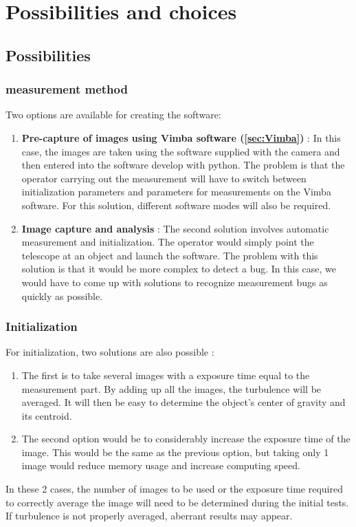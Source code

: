 \section{Possibilities and choices}
\subsection{Possibilities}
\subsubsection{measurement method}
Two options are available for creating the software:
\begin{enumerate}
    \item \textbf{Pre-capture of images using Vimba software (\ref{sec:Vimba})} : \newline
          In this case, the images are taken using the software supplied with the camera and then entered into the software develop with python.
          The problem is that the operator carrying out the measurement will have to switch between initialization parameters and parameters
          for measurements on the Vimba software. For this solution, different software modes will also be required.
    \item \textbf{Image capture and analysis} :\newline
          The second solution involves automatic measurement and initialization. The operator would simply point the telescope at an
          object and launch the software. The problem with this solution is that it would be more complex to detect a bug. In this case,
          we would have to come up with solutions to recognize measurement bugs as quickly as possible.
\end{enumerate}
\subsubsection{Initialization}
For initialization, two solutions are also possible :
\begin{enumerate}
    \item The first is to take several images with a exposure time equal to the measurement part. By adding up all the images,
          the turbulence will be averaged. It will then be easy to determine the object's center of gravity and its centroid.
    \item The second option would be to considerably increase the exposure time of the image. This would be the same as the
          previous option, but taking only 1 image would reduce memory usage and increase computing speed.
\end{enumerate}
In these 2 cases, the number of images to be used or the exposure time required to correctly average the image will need to
be determined during the initial tests. If turbulence is not properly averaged, aberrant results may appear.
